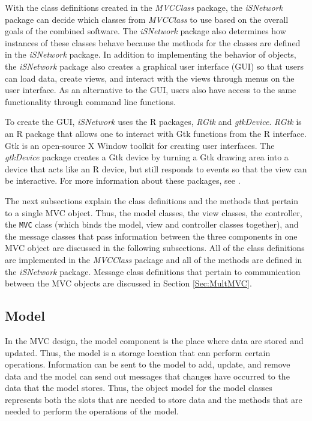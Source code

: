 \documentclass{article}[11pt]
\newcommand{\Robject}[1]{{\texttt{#1}}}
\newcommand{\Rpackage}[1]{{\textit{#1}}}
\begin{document}
With the class definitions created in the \Rpackage{MVCClass} package, the
\Rpackage{iSNetwork} package can decide which classes from \Rpackage{MVCClass}
to use based on the overall goals of the combined software.  The
\Rpackage{iSNetwork} package also determines how instances of these classes
behave because the methods for the classes are defined in the
\Rpackage{iSNetwork} package.  In addition to implementing the behavior of
objects, the \Rpackage{iSNetwork} package also creates a graphical user
interface (GUI) so that users can load data, create views, and interact with
the views through menus on the user interface.  As an alternative to the GUI,
users also have access to the same functionality through command line
functions.  

To create the GUI, \Rpackage{iSNetwork} uses the R packages,
\Rpackage{RGtk} and \Rpackage{gtkDevice}.  \Rpackage{RGtk} is an R package
that allows one to interact with Gtk functions from the R interface.  Gtk is
an open-source X Window toolkit \cite{Gtk} for creating user interfaces.  The
\Rpackage{gtkDevice} package creates a Gtk device by turning a Gtk drawing
area into a device that acts like an R device, but still responds to events so
that the view can be interactive.  For more information about these packages,
see \cite{EW05}.  

The next subsections explain the class definitions and the methods that
pertain to a single MVC object.  Thus, the model classes,
the view classes, the controller, the \Robject{MVC} class (which binds the
model, view and controller classes together), and the message classes that
pass information between the three components in one MVC object are
discussed in the following subsections.  All of the class definitions are
implemented in the \Rpackage{MVCClass} package and all of the methods are
defined in the \Rpackage{iSNetwork} package.  Message class definitions that
pertain to communication between the MVC objects are discussed in Section
\ref{Sec:MultMVC}. 

\subsection{Model}\label{Ssec:OneModel}

In the MVC design, the model component is the place where data are stored and
updated.  Thus, the model is a storage location that can perform certain
operations.  Information can be sent to the model to add, update, and remove
data and the model can send out messages that changes have occurred to the
data that the model stores.  Thus, the object model for the model classes
represents both the slots that are needed to store data and the methods that
are needed to perform the operations of the model. 
\end{document}
